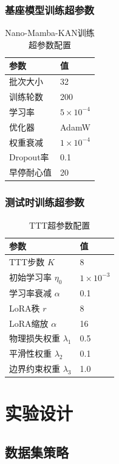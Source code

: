 \documentclass[12pt, a4paper]{article}
\begin{document}
\subsubsection{基座模型训练超参数}
\begin{table}[H]
\centering
\caption{Nano-Mamba-KAN训练超参数配置}
\begin{tabular}{ll}
\toprule
参数 & 值 \\
\midrule
批次大小 & 32 \\
训练轮数 & 200 \\
学习率 & $5 \times 10^{-4}$ \\
优化器 & AdamW \\
权重衰减 & $1 \times 10^{-4}$ \\
Dropout率 & 0.1 \\
早停耐心值 & 20 \\
\bottomrule
\end{tabular}
\end{table}

\subsubsection{测试时训练超参数}
\begin{table}[H]
\centering
\caption{TTT超参数配置}
\begin{tabular}{ll}
\toprule
参数 & 值 \\
\midrule
TTT步数 $K$ & 8 \\
初始学习率 $\eta_0$ & $1 \times 10^{-3}$ \\
学习率衰减 $\alpha$ & 0.1 \\
LoRA秩 $r$ & 8 \\
LoRA缩放 $\alpha$ & 16 \\
物理损失权重 $\lambda_1$ & 0.5 \\
平滑性权重 $\lambda_2$ & 0.1 \\
边界约束权重 $\lambda_3$ & 1.0 \\
\bottomrule
\end{tabular}
\end{table}

\newpage
\section{实验设计}

\subsection{数据集策略}
\end{document}
